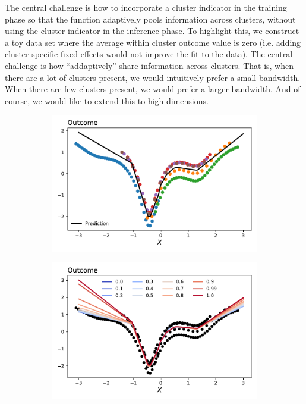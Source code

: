 \documentclass[a4paper,12pt]{article}
\begin{document}
The central challenge is how to incorporate a cluster indicator in the training phase so that the function adaptively pools information across clusters, without using the cluster indicator in the inference phase. To highlight this, we construct a toy data set where the average within cluster outcome value is zero (i.e. adding cluster specific fixed effects would not improve the fit to the data). The central challenge is how ``addaptively'' share information across clusters. That is, when there are a lot of clusters present, we would intuitively prefer a small bandwidth. When there are few clusters present, we would prefer a larger bandwidth. And of course, we would like to extend this to high dimensions.

\begin{figure}[htbp]
\centering
\begin{subfigure}{.48\textwidth}
    \centering
    \includegraphics[width=.95\linewidth]{figures/framework/gradient_descent_motivating_example.pdf}
\end{subfigure}
\begin{subfigure}{.48\textwidth}
    \centering
    \includegraphics[width=.95\linewidth]{figures/framework/gradient_descent_motivating_example_tune.pdf}

\end{subfigure}
\end{figure}
\end{document}
